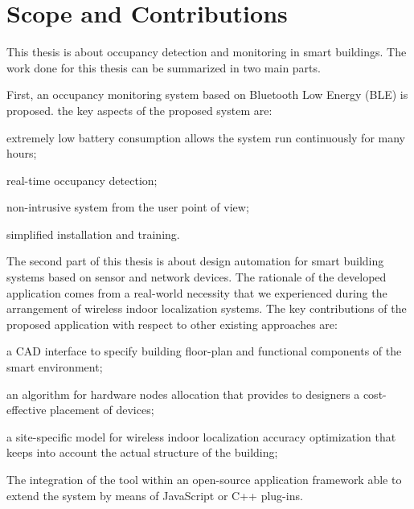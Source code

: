 \section{Scope and Contributions}
This thesis is about occupancy detection and monitoring in smart buildings.
The work done for this thesis can be summarized in two main parts.

\medskip
First, an occupancy monitoring system based on Bluetooth Low Energy (BLE) is proposed. the key aspects of the proposed system are:
\begin{enumerate*}[label={\textbf{(\arabic*)}}]
\item extremely low battery consumption allows the system run continuously for many hours;
\item real-time occupancy detection;
\item non-intrusive system from the user point of view;
\item simplified installation and training.
\end{enumerate*}

\medskip
The second part of this thesis is about design automation for smart building systems based on sensor and network devices. The rationale of the developed application comes from a real-world necessity that we experienced during the arrangement of wireless indoor localization systems. The key contributions of the proposed application with respect to other existing approaches are:
\begin{enumerate*}[label={\textbf{(\arabic*)}}]
\item a CAD interface to specify building floor-plan and functional components of the smart environment;
\item an algorithm for hardware nodes allocation that provides to designers a cost-effective placement of devices;
\item a site-specific model for wireless indoor localization accuracy optimization that keeps into account the actual structure of the building;
\item The integration of the tool within an \mbox{open-source} application framework able to extend the system by means of JavaScript or C++ plug-ins.
\end{enumerate*}


